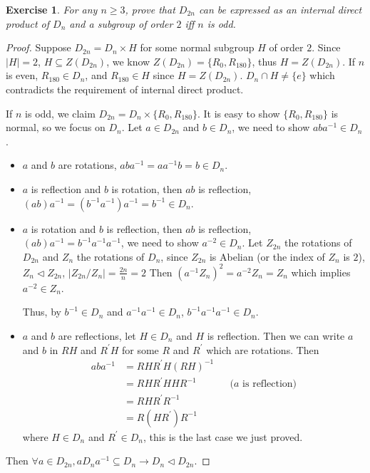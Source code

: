 \documentclass[14pt]{extarticle}
\newtheorem{exercise}{Exercise}[section]
\newcommand{\inv}[1]{#1^{-1}}
\newcommand{\normalin}{\triangleleft}
\newcommand{\1}{\{ e \}}
\begin{document}
\setcounter{exercise}{83}
\begin{exercise}
  For any $n \geq 3$, prove that 
  $D_{2n}$ can be expressed as an internal direct product of
  $D_n$ and a subgroup of order $2$
  iff
  $n$ is odd.
\end{exercise}
\begin{proof}
  Suppose $D_{2n} = D_n \times H$ for some normal subgroup $H$ of order $2$.
  Since $|H| = 2$, $H \subseteq Z(D_{2n})$,
  we know $Z(D_{2n}) = \{ R_0 , R_{180} \}$,
  thus $H = Z(D_{2n})$.
  If $n$ is even, $R_{180} \in D_n$, and $R_{180} \in H$ since $H = Z(D_{2n})$.
  $D_n \cap H \neq \{ e \}$ which contradicts the requirement of internal direct product.

  If $n$ is odd, we claim $D_{2n} = D_n \times \{ R_0 , R_{180} \}$.
  It is easy to show $\{ R_0 , R_{180} \}$ is normal, so we focus on $D_n$.
  Let $a \in D_{2n}$ and $b \in D_n$, we need to show $ab\inv{a} \in D_n$.
  \begin{itemize}
    \item $a$ and $b$ are rotations, $ab\inv{a} = a\inv{a}b = b \in D_n$.
    \item $a$ is reflection and $b$ is rotation, then $ab$ is reflection, \\
      $(ab)\inv{a} = (\inv{b}\inv{a})\inv{a} = \inv{b} \in D_n$.
    \item $a$ is rotation and $b$ is reflection, then $ab$ is reflection, \\
      $(ab)\inv{a} = \inv{b}\inv{a}\inv{a}$, we need to show $a^{-2} \in D_n$.
      Let $Z_{2n}$ the rotations of $D_{2n}$ and $Z_n$ the rotations of $D_n$,
      since $Z_{2n}$ is Abelian (or the index of $Z_n$ is $2$), $Z_n \normalin Z_{2n}$, $\displaystyle |Z_{2n}/Z_n| = \frac{2n}{n} = 2$
      Then $(\inv{a}Z_n)^2 = a^{-2}Z_n = Z_n$ which implies $a^{-2} \in Z_n$.

      Thus, by $\inv{b} \in D_n$ and $\inv{a}\inv{a} \in D_n$, $\inv{b}\inv{a}\inv{a} \in D_n$.
    \item $a$ and $b$ are reflections, let $H \in D_n$ and $H$ is reflection.
      Then we can write $a$ and $b$ in $RH$ and $R^\prime H$ for some $R$ and $R^\prime$ which are rotations.
      Then
      \begin{align*}
        ab\inv{a} &= RH R^\prime H \inv{(RH)} \\
                  &= RH R^\prime H H \inv{R} && \text{($a$ is reflection)} \\
                  &= RH R^\prime \inv{R} \\
                  &= R (H R^\prime) \inv{R}
      \end{align*}
      where $H \in D_n$ and $R^\prime \in D_n$, this is the last case we just proved.
  \end{itemize}
  Then $\forall a \in D_{2n}, aD_n\inv{a} \subseteq D_n \rightarrow D_n \normalin D_{2n}$.


\end{proof}
\end{document}
